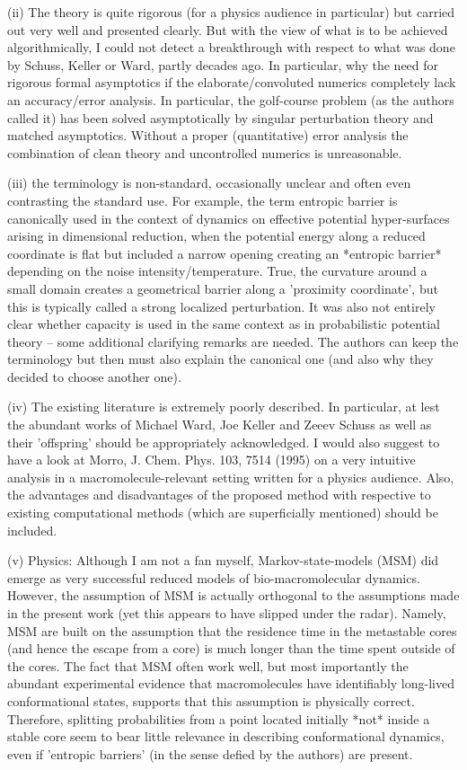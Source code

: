 \documentclass{article}
\begin{document}
(ii) The theory is quite rigorous (for a physics audience in
particular) but carried out very well and presented clearly. But with
the view of what is to be achieved algorithmically, I could not detect
a breakthrough with respect to what was done by Schuss, Keller or
Ward, partly decades ago. In particular, why the need for rigorous
formal asymptotics if the elaborate/convoluted numerics completely
lack an accuracy/error analysis. In particular, the golf-course
problem (as the authors called it) has been solved asymptotically by
singular perturbation theory and matched asymptotics. Without a proper
(quantitative) error analysis the combination of clean theory and
uncontrolled numerics is unreasonable.

(iii) the terminology is non-standard, occasionally unclear and often
even contrasting the standard use. For example, the term entropic
barrier is canonically used in the context of dynamics on effective
potential hyper-surfaces arising in dimensional reduction, when the
potential energy along a reduced coordinate is flat but included a
narrow opening creating an *entropic barrier* depending on the noise
intensity/temperature. True, the curvature around a small domain
creates a geometrical barrier along a 'proximity coordinate', but this
is typically called a strong localized perturbation. It was also not
entirely clear whether capacity is used in the same context as in
probabilistic potential theory -- some additional clarifying remarks
are needed. The authors can keep the terminology but then must also
explain the canonical one (and also why they decided to choose another
one).

(iv) The existing literature is extremely poorly described. In
particular, at lest the abundant works of Michael Ward, Joe Keller and
Zeeev Schuss as well as their 'offspring' should be appropriately
acknowledged. I would also suggest to have a look at Morro, J. Chem.
Phys. 103, 7514 (1995) on a very intuitive analysis in a
macromolecule-relevant setting written for a physics audience. Also,
the advantages and disadvantages of the proposed method with
respective to existing computational methods (which are superficially
mentioned) should be included.

(v) Physics: Although I am not a fan myself, Markov-state-models (MSM)
did emerge as very successful reduced models of bio-macromolecular
dynamics. However, the assumption of MSM is actually orthogonal to the
assumptions made in the present work (yet this appears to have slipped
under the radar). Namely, MSM are built on the assumption that the
residence time in the metastable cores (and hence the escape from a
core) is much longer than the time spent outside of the cores. The
fact that MSM often work well, but most importantly the abundant
experimental evidence that macromolecules have identifiably long-lived
conformational states, supports that this assumption is physically
correct. Therefore, splitting probabilities from a point located
initially *not* inside a stable core seem to bear little relevance in
describing conformational dynamics, even if 'entropic barriers' (in
the sense defied by the authors) are present.
\end{document}
